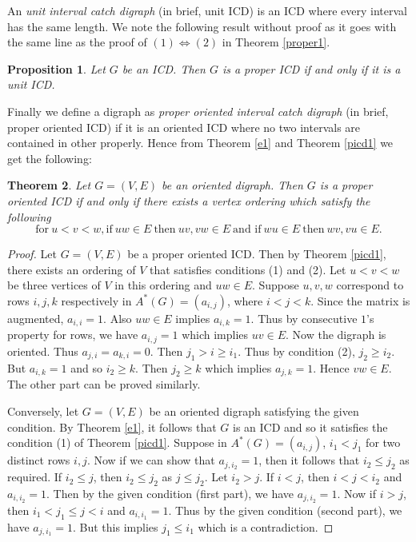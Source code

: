 \documentclass{article}
\newtheorem{thm}{Theorem}[section]
\newtheorem{prop}[thm]{Proposition}
\theoremstyle{definition}
\numberwithin{equation}{section}
\begin{document}
\noindent An {\em unit interval catch digraph} (in brief, unit ICD) is an ICD where every interval has the same length. We note the following result without proof as it goes with the same line as the proof of $(1)\Longleftrightarrow (2)$ in Theorem \ref{proper1}.

\begin{prop}
Let $G$ be an ICD. Then $G$ is a proper ICD if and only if it is a unit ICD.
\end{prop}

\noindent Finally we define a digraph as {\em proper oriented interval catch digraph} (in brief, proper oriented ICD) if it is an oriented ICD where no two intervals are contained in other properly. Hence from Theorem \ref{e1} and Theorem \ref{picd1} we get the following:

\begin{thm}\label{poicd1}
Let $G=(V,E)$ be an oriented digraph. Then $G$ is a proper oriented ICD if and only if there exists a vertex ordering which satisfy the following
\begin{equation} \label{poicd}
\text{for} \ u<v<w, \text{if} \ uw\in E \ \text{then} \ uv,vw\in E \ \text{and if} \ wu\in E \ \text{then} \ wv,vu\in E.
\end{equation}
\end{thm}

\begin{proof}
Let $G=(V,E)$ be a proper oriented ICD. Then by Theorem \ref{picd1}, there exists an ordering of $V$ that satisfies conditions (1) and (2). Let $u<v<w$ be three vertices of $V$ in this ordering and $uw\in E$. Suppose $u,v,w$ correspond to rows $i,j,k$ respectively in $A^*(G)=(a_{i,j})$, where $i<j<k$. Since the matrix is augmented, $a_{i,i}=1$. Also $uw\in E$ implies $a_{i,k}=1$. Thus by consecutive $1$'s property for rows, we have $a_{i,j}=1$ which implies $uv\in E$. Now the digraph is oriented. Thus $a_{j,i}=a_{k,i}=0$. Then $j_1>i\geq i_1$. Thus by condition (2), $j_2\geq i_2$. But $a_{i,k}=1$ and so $i_2\geq k$. Then $j_2\geq k$ which implies $a_{j,k}=1$. Hence $vw\in E$. The other part can be proved similarly.

\vspace{0.5em}\noindent
Conversely, let $G=(V,E)$ be an oriented digraph satisfying the given condition. By Theorem \ref{e1}, it follows that $G$ is an ICD and so it satisfies the condition (1) of Theorem \ref{picd1}. Suppose in $A^*(G)=(a_{i,j})$, $i_1<j_1$ for two distinct rows $i,j$. Now if we can show that $a_{j,i_2}=1$, then it follows that $i_2\leq j_2$ as required. If $i_2\leq j$, then $i_2\leq j_2$ as $j\leq j_2$. Let $i_2>j$. If $i<j$, then $i<j<i_2$ and $a_{i,i_2}=1$. Then by the given condition (first part), we have $a_{j,i_2}=1$. Now if $i>j$, then $i_1<j_1\leq j<i$ and $a_{i,i_1}=1$. Thus by the given condition (second part), we have $a_{j,i_1}=1$. But this implies $j_1\leq i_1$ which is a contradiction.
\end{proof}
\end{document}
